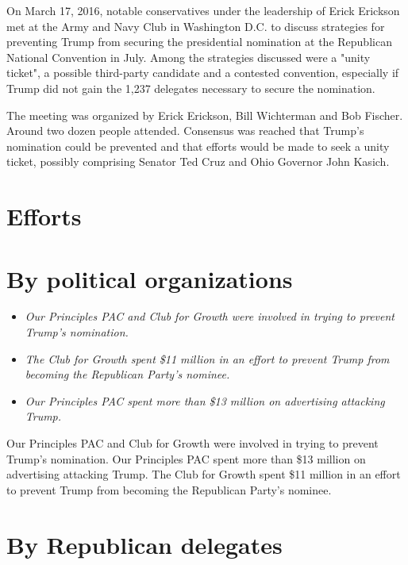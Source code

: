 On March 17, 2016, notable conservatives under the leadership of Erick
Erickson met at the Army and Navy Club in Washington D.C. to discuss
strategies for preventing Trump from securing the presidential
nomination at the Republican National Convention in July. Among the
strategies discussed were a "unity ticket", a possible third-party
candidate and a contested convention, especially if Trump did not gain
the 1,237 delegates necessary to secure the nomination.

The meeting was organized by Erick Erickson, Bill Wichterman and Bob
Fischer. Around two dozen people attended. Consensus was reached that
Trump's nomination could be prevented and that efforts would be made to
seek a unity ticket, possibly comprising Senator Ted Cruz and Ohio
Governor John Kasich.

\section{Efforts}\label{efforts}

\section{By political organizations}\label{by-political-organizations}

\begin{itemize}
\item
  \emph{Our Principles PAC and Club for Growth were involved in trying
  to prevent Trump's nomination.}
\item
  \emph{The Club for Growth spent \$11 million in an effort to prevent
  Trump from becoming the Republican Party's nominee.}
\item
  \emph{Our Principles PAC spent more than \$13 million on advertising
  attacking Trump.}
\end{itemize}

Our Principles PAC and Club for Growth were involved in trying to
prevent Trump's nomination. Our Principles PAC spent more than \$13
million on advertising attacking Trump. The Club for Growth spent \$11
million in an effort to prevent Trump from becoming the Republican
Party's nominee.

\section{By Republican delegates}\label{by-republican-delegates}

